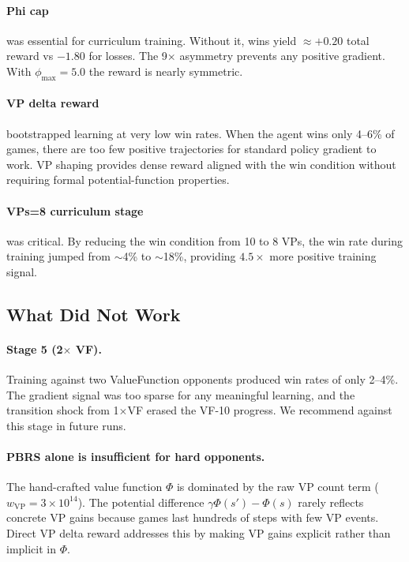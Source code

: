 \documentclass[10pt,twocolumn]{article}
\begin{document}
\paragraph{Phi cap} was essential for curriculum training. Without it, wins yield
$\approx +0.20$ total reward vs $-1.80$ for losses. The 9$\times$ asymmetry
prevents any positive gradient. With $\phi_{\max}{=}5.0$ the reward is nearly symmetric.

\paragraph{VP delta reward} bootstrapped learning at very low win rates. When the
agent wins only 4--6\% of games, there are too few positive trajectories for
standard policy gradient to work. VP shaping provides dense reward aligned with
the win condition without requiring formal potential-function properties.

\paragraph{VPs=8 curriculum stage} was critical. By reducing the win condition from
10 to 8 VPs, the win rate during training jumped from $\sim$4\% to $\sim$18\%,
providing $4.5\times$ more positive training signal.

\subsection{What Did Not Work}

\paragraph{Stage 5 (2$\times$ VF).} Training against two ValueFunction opponents
produced win rates of only 2--4\%. The gradient signal was too sparse for any
meaningful learning, and the transition shock from 1$\times$VF erased the VF-10
progress. We recommend against this stage in future runs.

\paragraph{PBRS alone is insufficient for hard opponents.} The hand-crafted value
function $\Phi$ is dominated by the raw VP count term ($w_{\text{VP}} = 3 \times 10^{14}$).
The potential difference $\gamma\Phi(s') - \Phi(s)$ rarely reflects concrete VP gains
because games last hundreds of steps with few VP events. Direct VP delta reward
addresses this by making VP gains explicit rather than implicit in $\Phi$.
\end{document}

